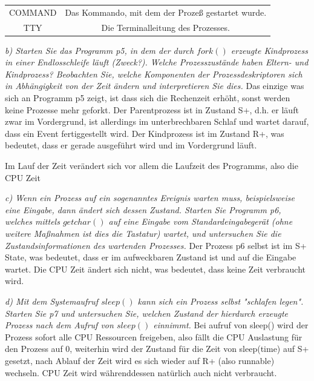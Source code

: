 \documentclass[a4paper]{article}
\begin{document}
\begin{tabular}{c|c}
    COMMAND & Das Kommando, mit dem der Prozeß gestartet wurde.                                                                                                                                                                                                                                                                                                                          \\
    TTY     & Die Terminalleitung des Prozesses.                                                                                                                                                                                                                                                                                                                                         \\
\end{tabular}

\textit{b) Starten Sie das Programm p5, in dem der durch $fork()$ erzeugte Kindprozess in einer Endlosschleife läuft (Zweck?). Welche Prozesszustände haben Eltern- und Kindprozess? Beobachten Sie, welche Komponenten der Prozessdeskriptoren sich in Abhängigkeit von der Zeit ändern und interpretieren Sie dies.}
\vspace{10mm}
Das einzige was sich an Programm p5 zeigt, ist dass sich die Rechenzeit erhöht, sonst werden keine Prozesse mehr geforkt. Der Parentprozess ist in Zustand S+, d.h. er läuft zwar im Vordergrund, ist allerdings im unterbrechbaren Schlaf und wartet darauf, dass ein Event fertiggestellt wird. Der Kindprozess ist im Zustand R+, was bedeutet, dass er gerade ausgeführt wird und im Vordergrund läuft.

Im Lauf der Zeit verändert sich vor allem die Laufzeit des Programms, also die CPU Zeit


\textit{c) Wenn ein Prozess auf ein sogenanntes Ereignis warten muss, beispielsweise eine Eingabe, dann ändert sich dessen Zustand. Starten Sie Programm p6, welches mittels $getchar()$ auf eine Eingabe vom Standardeingabegerät (ohne weitere Maßnahmen ist dies die Tastatur) wartet, und untersuchen Sie die Zustandsinformationen des wartenden Prozesses.}
\vspace{10mm}
Der Prozess p6 selbst ist im S+ State, was bedeutet, dass er im aufweckbaren Zustand ist und auf die Eingabe wartet. Die CPU Zeit ändert sich nicht, was bedeutet, dass keine Zeit verbraucht wird.

\textit{d) Mit dem Systemaufruf $sleep()$ kann sich ein Prozess selbst "schlafen legen". Starten Sie p7 und untersuchen Sie, welchen Zustand der hierdurch erzeugte Prozess nach dem Aufruf von $sleep()$ einnimmt.}
\vspace{10mm}
Bei aufruf von sleep() wird der Prozess sofort alle CPU Ressourcen freigeben, also fällt die CPU Auslastung für den Prozess auf 0, weiterhin wird der Zustand für die Zeit von sleep(time) auf S+ gesetzt, nach Ablauf der Zeit wird es sich wieder auf R+ (also runnable) wechseln. CPU Zeit wird währenddessen natürlich auch nicht verbraucht.
\end{document}
